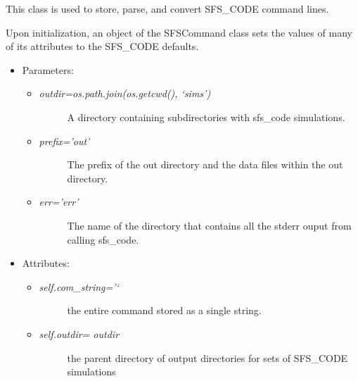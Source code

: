 \documentclass[letterpaper,10pt,english]{sphinxmanual}
\begin{document}
\begin{fulllineitems}
\label{index:command.SFSCommand}
This class is used to store, parse, and convert SFS\_CODE command lines.

Upon initialization, an object of the SFSCommand class sets the values
of many of its attributes to the SFS\_CODE defaults.
\begin{itemize}
\item {} 
Parameters:
\begin{itemize}
\item {} \begin{description}
\item[{\emph{outdir=os.path.join(os.getcwd(), `sims')} }] \leavevmode
A directory containing
subdirectories with sfs\_code simulations.

\end{description}

\item {} \begin{description}
\item[{\emph{prefix='out'} }] \leavevmode
The prefix of the out directory and the data files 
within the out directory.

\end{description}

\item {} \begin{description}
\item[{\emph{err='err'}}] \leavevmode
The name of the directory that contains all the stderr ouput from
calling sfs\_code.

\end{description}

\end{itemize}

\item {} 
Attributes:
\begin{itemize}
\item {} \begin{description}
\item[{\emph{self.com\_string='`}}] \leavevmode
the entire command stored as a single string.

\end{description}

\item {} \begin{description}
\item[{\emph{self.outdir= outdir}   }] \leavevmode
the parent directory of output directories for sets of SFS\_CODE 
simulations


\end{description}
\end{itemize}
\end{itemize}
\end{fulllineitems}
\end{document}
